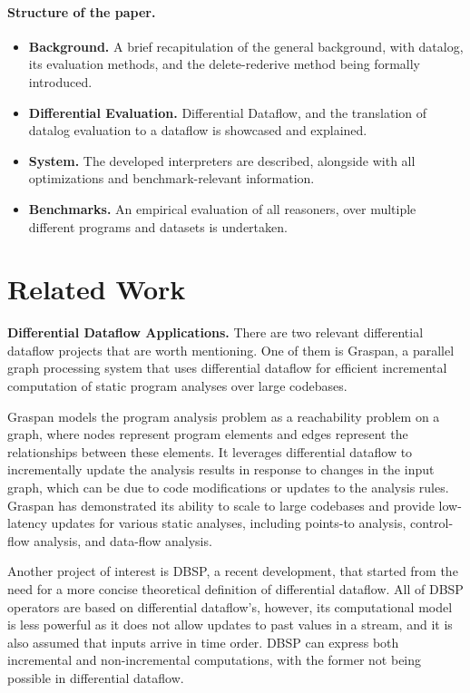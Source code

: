 \documentclass[sigconf,screen,review,natbib]{acmart}
\theoremstyle{definition}
\begin{document}
\paragraph{Structure of the paper.}
\begin{itemize}
	\item{\textbf{Background.}} A brief recapitulation of the general background, with datalog, its evaluation
	methods, and the delete-rederive method being formally introduced.
	\item{\textbf{Differential Evaluation.}} Differential Dataflow, and the translation of datalog evaluation to
	a dataflow is showcased and explained.
	\item{\textbf{System.}} The developed interpreters are described, alongside with all optimizations and
	benchmark-relevant information.
	\item{\textbf{Benchmarks.}} An empirical evaluation of all reasoners, over multiple different programs and
	datasets is undertaken.
\end{itemize}
\section{Related Work}

\textbf{Differential Dataflow Applications.} There are two relevant differential dataflow projects that are worth
mentioning. One of them is Graspan, a parallel graph processing system that uses differential dataflow for efficient
incremental computation of static program analyses over large codebases.

Graspan models the program analysis problem as a reachability problem on a graph, where nodes represent program elements
and edges represent the relationships between these elements. It leverages differential dataflow to incrementally update
the analysis results in response to changes in the input graph, which can be due to code modifications or updates to
the analysis rules. Graspan has demonstrated its ability to scale to large codebases and provide low-latency updates
for various static analyses, including points-to analysis, control-flow analysis, and data-flow analysis.

Another project of interest is DBSP\cite{dbsp}, a recent development, that started from the need for a more concise
theoretical definition of differential dataflow. All of DBSP operators are based on differential dataflow's, however, its
computational model is less powerful as it does not allow updates to past values in a stream, and it is also assumed that
inputs arrive in time order. DBSP can express both incremental and non-incremental computations, with the former not being
possible in differential dataflow.
\end{document}
